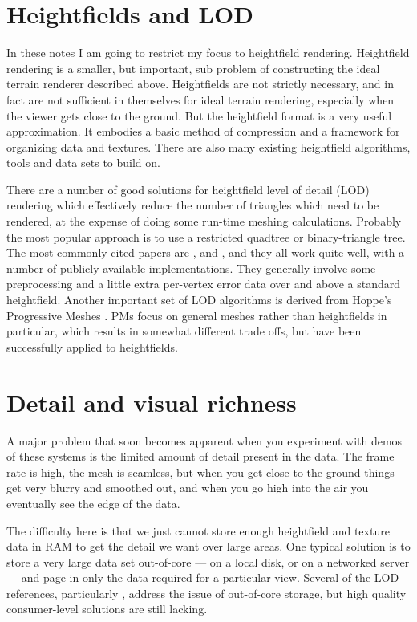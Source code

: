 \documentclass[12pt]{article}
\begin{document}
\section{Heightfields and LOD}

In these notes I am going to restrict my focus to heightfield
rendering.  Heightfield rendering is a smaller, but important,
sub problem of constructing the ideal terrain renderer described above.
Heightfields are not strictly necessary, and in fact are not
sufficient in themselves for ideal terrain rendering, especially when
the viewer gets close to the ground.  But the heightfield format is a
very useful approximation.  It embodies a basic method of compression
and a framework for organizing data and textures.  There are also many
existing heightfield algorithms, tools and data sets to build on.

 
There are a number of good solutions for heightfield level of detail
(LOD) rendering which effectively reduce the number of triangles which
need to be rendered, at the expense of doing some run-time meshing
calculations.  Probably the most popular approach is to use a
restricted quadtree or binary-triangle tree.  The most commonly cited
papers are \cite{lindstrom96}, \cite{duchaineau} and \cite{rottger},
and they all work quite well, with a number of publicly available
implementations.  They generally involve some preprocessing and a
little extra per-vertex error data over and above a standard
heightfield.  Another important set of LOD algorithms is derived from
Hoppe's Progressive Meshes \cite{hoppe96}.  PMs focus on general meshes rather
than heightfields in particular, which results in somewhat different
trade offs, but have been successfully applied to heightfields.
 
\section{Detail and visual richness}

A major problem that soon becomes apparent when you experiment with
demos of these systems is the limited amount of detail present in the
data.  The frame rate is high, the mesh is seamless, but when you get
close to the ground things get very blurry and smoothed out, and when
you go high into the air you eventually see the edge of the data.

The difficulty here is that we just cannot store enough heightfield
and texture data in RAM to get the detail we want over large areas.
One typical solution is to store a very large data set out-of-core ---
on a local disk, or on a networked server --- and page in only the
data required for a particular view.  Several of the LOD references,
particularly \cite{lindstrom01}, address the issue of out-of-core
storage, but high quality consumer-level solutions are still lacking. %
\end{document}

